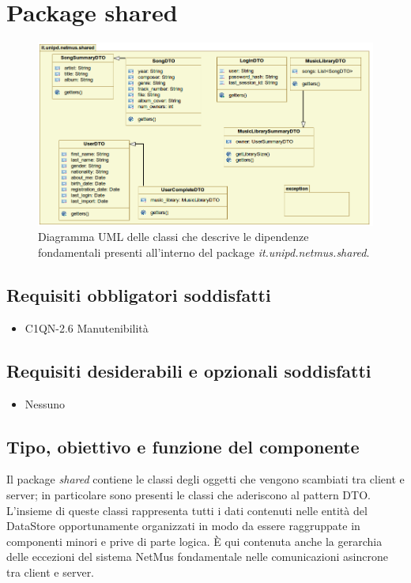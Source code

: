 \newpage
\section{Package shared}

\begin{figure}[!h]
  \centering
  \includegraphics[width=15cm]{img/DP/classes_shared.png}
\caption{Diagramma UML delle classi che descrive le dipendenze
fondamentali presenti all'interno del package
\emph{it.unipd.netmus.shared}.}
\end{figure}

\subsection*{Requisiti obbligatori soddisfatti}
\begin{itemize}
  	\item C1QN-2.6 Manutenibilit\`a
\end{itemize}
\subsection*{Requisiti desiderabili e opzionali soddisfatti}
\begin{itemize}
    \item Nessuno
\end{itemize}
\subsection*{Tipo, obiettivo e funzione del componente}
Il package \emph{shared} contiene le classi degli oggetti che vengono
scambiati tra client e server; in particolare sono presenti le classi che
aderiscono al pattern DTO. L'insieme di queste classi rappresenta tutti i
dati contenuti nelle entit\`a del DataStore opportunamente organizzati in modo
da essere raggruppate in componenti minori e prive di parte logica.
\`E qui contenuta anche la gerarchia delle eccezioni del sistema NetMus
fondamentale nelle comunicazioni asincrone tra client e server.
